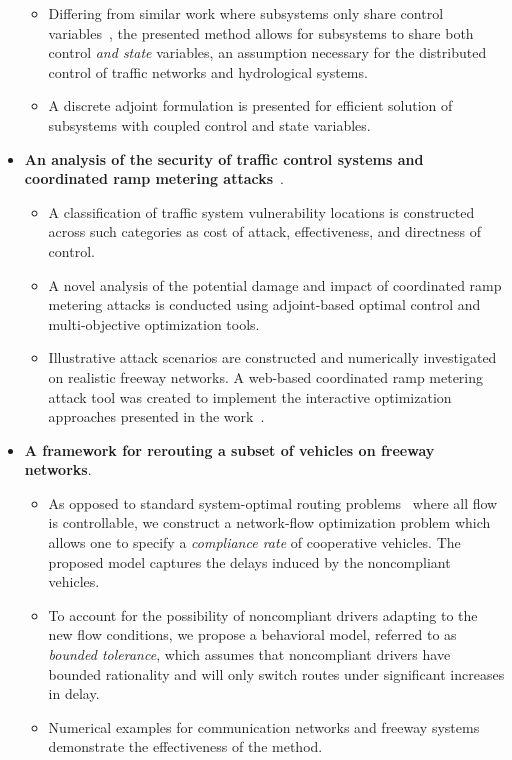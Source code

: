 \begin{itemize}
\begin{itemize}
		\item Differing from similar work where subsystems only share control variables~\cite{mota2012distributed,camponogara2009distributed}, the presented method allows for subsystems to share both control \emph{and state} variables, an assumption necessary for the distributed control of traffic networks and hydrological systems.
		\item A discrete adjoint formulation is presented for efficient solution of subsystems with coupled control and state variables.
	\end{itemize}
	\item \textbf{An analysis of the security of traffic control systems and coordinated ramp metering attacks}~\cite{Reilly2014c,Reilly2014a}.
	\begin{itemize}
		\item A classification of traffic system vulnerability locations is constructed across such categories as cost of attack, effectiveness, and directness of control.
		\item A novel analysis of the potential damage and impact of coordinated ramp metering attacks is conducted using adjoint-based optimal control and multi-objective optimization tools.
		\item Illustrative attack scenarios are constructed and numerically investigated on realistic freeway networks. A web-based coordinated ramp metering attack tool was created to implement the interactive optimization approaches presented in the work~\cite{smartroadswebsite}.
	\end{itemize}
	\item \textbf{A framework for rerouting a subset of vehicles on freeway networks}.
	\begin{itemize}
		\item As opposed to standard system-optimal routing problems~\cite{ziliaskopoulos2000linear,Kelly} where all flow is controllable, we construct a network-flow optimization problem which allows one to specify a \emph{compliance rate} of cooperative vehicles. The proposed model captures the delays induced by the noncompliant vehicles.
		\item To account for the possibility of noncompliant drivers adapting to the new flow conditions, we propose a behavioral model, referred to as \emph{bounded tolerance}, which assumes that noncompliant drivers have bounded rationality and will only switch routes under significant increases in delay.
		\item Numerical examples for communication networks and freeway systems demonstrate the effectiveness of the method.  
	\end{itemize}
\end{itemize}

